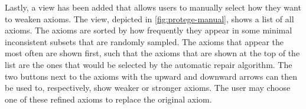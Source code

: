 Lastly, a view has been added that allows users to manually select how they want to weaken axioms. The view, depicted in \cref{fig:protege-manual}, shows a list of all axioms. The axioms are sorted by how frequently they appear in some minimal inconsistent subsets that are randomly sampled. The axioms that appear the most often are shown first, such that the axioms that are shown at the top of the list are the ones that would be selected by the automatic repair algorithm. The two buttons next to the axioms with the upward and downward arrows can then be used to, respectively, show weaker or stronger axioms. The user may choose one of these refined axioms to replace the original axiom.

